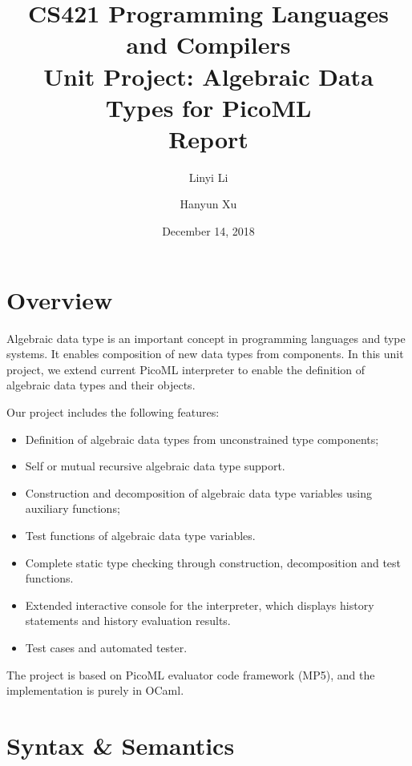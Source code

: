 \documentclass[a4paper,12pt]{article}
\begin{document}
\title{CS421 Programming Languages and Compilers\\ Unit Project: Algebraic Data Types for PicoML\\ Report}
\author{Linyi Li \and Hanyun Xu}
\date{December 14, 2018}
\maketitle

\section{Overview}
	Algebraic data type is an important concept in programming languages and type systems. It enables composition of new data types from components. In this unit project, we extend current PicoML interpreter to enable the definition of algebraic data types and their objects.
	
	Our project includes the following features:
	\begin{itemize}
		\item Definition of algebraic data types from unconstrained type components;
		
		\item Self or mutual recursive algebraic data type support.
				
		\item Construction and decomposition of algebraic data type variables using auxiliary functions;
		
		\item Test functions of algebraic data type variables.
		
		\item Complete static type checking through construction, decomposition and test functions.
		
		\item Extended interactive console for the interpreter, which displays history statements and history evaluation results.
		
		\item Test cases and automated tester.
	\end{itemize}

	The project is based on PicoML evaluator code framework (MP5), and the implementation is purely in OCaml.

\section{Syntax \& Semantics}
	
\end{document}
